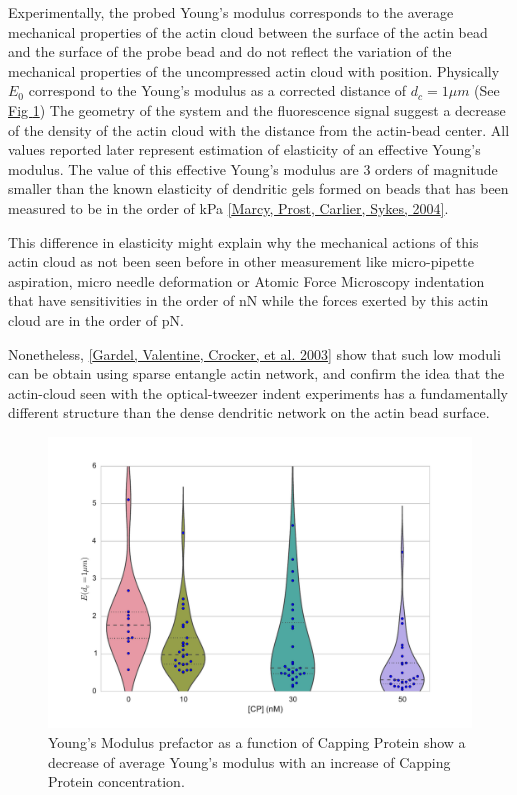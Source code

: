 \documentclass[A4paperpaper,11pt,english]{sphinxmanual}
\begin{document}
Experimentally, the probed Young's modulus corresponds to the average mechanical
properties of the actin cloud between the surface of the actin bead and the
surface of the probe bead and do not reflect the variation of the mechanical
properties of the uncompressed actin cloud with position.
Physically \(E_0\) correspond to the Young's modulus as a corrected distance of \(d_c = 1 \mu{}m\)
(See \hyperref[index-latex:ev]{Fig  \ref*{index-latex:ev}})
The geometry of the
system and the fluorescence signal suggest a decrease of the density of the
actin cloud with the distance from the actin-bead center. All values
reported later represent estimation of elasticity of an effective Young's
modulus. The value of this effective Young's modulus are 3 orders of magnitude
smaller than the known elasticity of dendritic gels formed on beads that has been measured to be in the
order of kPa {\hyperref[index-latex:marcy2004]{{[}Marcy, Prost, Carlier, Sykes,  2004{]}}}.

This difference in elasticity might explain why the mechanical actions of this actin cloud as not been
seen before in other measurement like micro-pipette aspiration,
micro needle deformation or Atomic Force Microscopy indentation that have
sensitivities in the order of nN while the forces exerted by this actin cloud
are in the order of pN.

Nonetheless, {\hyperref[index-latex:gardel2003]{{[}Gardel, Valentine, Crocker,  et al.  2003{]}}} show that such low moduli can be obtain using
sparse entangle actin network, and confirm the idea that the actin-cloud seen
with the optical-tweezer indent experiments has a fundamentally different
structure than the dense dendritic network on the actin
bead surface.
\begin{figure}[htbp]
\centering
\capstart

\includegraphics[width=0.800\linewidth]{E0_violin.pdf}
\caption{Young's Modulus prefactor as a function of Capping Protein show a decrease of
average Young's modulus with an increase of Capping Protein concentration.}\label{index-latex:ev}\end{figure}
\end{document}
